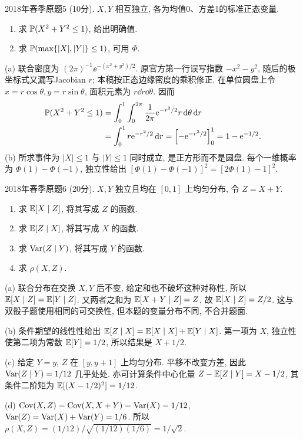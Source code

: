 \begin{exercise}\label{m2:2018s:q5}
2018年春季原题5 (10分). $X,Y$ 相互独立, 各为均值0、方差1的标准正态变量.
\begin{enumerate}
\item[(a)]\label{m2:2018s:q5:a} 求 $\mathbb P(X^2+Y^2\le1)$, 给出明确值.
\item[(b)]\label{m2:2018s:q5:b} 求 $\mathbb P(\max\{|X|,|Y|\}\le1)$, 可用 $\Phi$.
\end{enumerate}
\end{exercise}
\begin{solution}
(a) 联合密度为 $(2\pi)^{-1}\ee^{-(x^2+y^2)/2}$. 原官方第一行误写指数 $-x^2-y^2$, 随后的极坐标式又漏写Jacobian $r$; 本稿按正态边缘密度的乘积修正. 在单位圆盘上令 $x=r\cos\theta,y=r\sin\theta$, 面积元素为 $r\dd r\dd\theta$. 因而
\begin{align*}
\mathbb P(X^2+Y^2\le1)
&=\int_0^1\int_0^{2\pi}\frac1{2\pi}\mathrm e^{-r^2/2}r\,\mathrm d\theta\,\mathrm d r\\
&=\int_0^1r\mathrm e^{-r^2/2}\,\mathrm d r
=\left[-\mathrm e^{-r^2/2}\right]_0^1=1-\mathrm e^{-1/2}.
\end{align*}
(b) 所求事件为 $|X|\le1$ 与 $|Y|\le1$ 同时成立, 是正方形而不是圆盘. 每个一维概率为 $\Phi(1)-\Phi(-1)$, 独立性给出 $[\Phi(1)-\Phi(-1)]^2=[2\Phi(1)-1]^2$.
\end{solution}

\begin{exercise}\label{m2:2018s:q6}
2018年春季原题6 (20分). $X,Y$ 独立且均在 $[0,1]$ 上均匀分布, 令 $Z=X+Y$.
\begin{enumerate}
\item[(a)]\label{m2:2018s:q6:a} 求 $\mathbb E[X\mid Z]$, 将其写成 $Z$ 的函数.
\item[(b)]\label{m2:2018s:q6:b} 求 $\mathbb E[Z\mid X]$, 将其写成 $X$ 的函数.
\item[(c)]\label{m2:2018s:q6:c} 求 $\operatorname{Var}(Z\mid Y)$, 将其写成 $Y$ 的函数.
\item[(d)]\label{m2:2018s:q6:d} 求 $\rho(X,Z)$.
\end{enumerate}
\end{exercise}
\begin{solution}
(a) 联合分布在交换 $X,Y$ 后不变, 给定和也不破坏这种对称性, 所以 $\mathbb E[X\mid Z]=\mathbb E[Y\mid Z]$. 又两者之和为 $\mathbb E[X+Y\mid Z]=Z$, 故 $\mathbb E[X\mid Z]=Z/2$. 这与双骰子题使用相同的可交换性, 但本题的变量分布不同, 不合并题面.

(b) 条件期望的线性性给出 $\mathbb E[Z\mid X]=\mathbb E[X\mid X]+\mathbb E[Y\mid X]$. 第一项为 $X$, 独立性使第二项为常数 $\mathbb E[Y]=1/2$, 所以结果是 $X+1/2$.

(c) 给定 $Y=y$, $Z$ 在 $[y,y+1]$ 上均匀分布. 平移不改变方差, 因此 $\operatorname{Var}(Z\mid Y)=1/12$ 几乎处处. 亦可计算条件中心化量 $Z-\mathbb E[Z\mid Y]=X-1/2$, 其条件二阶矩为 $\mathbb E[(X-1/2)^2]=1/12$.

(d) $\operatorname{Cov}(X,Z)=\operatorname{Cov}(X,X+Y)=\operatorname{Var}(X)=1/12$, $\operatorname{Var}(Z)=\operatorname{Var}(X)+\operatorname{Var}(Y)=1/6$. 所以 $\rho(X,Z)=(1/12)/\sqrt{(1/12)(1/6)}=1/\sqrt2$.
\end{solution}

